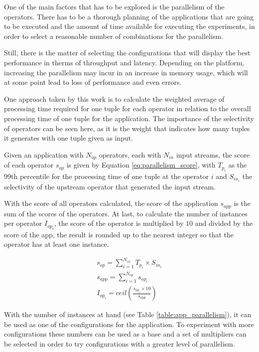\documentclass[ppgc,diss,english]{iiufrgs}
\begin{document}
One of the main factors that has to be explored is the parallelism of the operators. There has to be a thorough planning of the applications that are going to be executed and the amount of time available for executing the experiments, in order to select a reasonable number of combinations for the parallelism.

Still, there is the matter of selecting the configurations that will display the best performance in therms of throughput and latency. Depending on the platform, increasing the parallelism may incur in an increase in memory usage, which will at some point lead to loss of performance and even errors.

One approach taken by this work is to calculate the weighted average of processing time required for one tuple for each operator in relation to the overall processing time of one tuple for the application. The importance of the selectivity of operators can be seen here, as it is the weight that indicates how many tuples it generates with one tuple given as input.

Given an application with $N_{op}$ operators, each with $N_{in}$ input streams, the score of each operator $s_{op}$ is given by Equation \ref{eq:parallelism_score}, with $T_{p_{i}}$ as the 99th percentile for the processing time of one tuple at the operator $i$ and $S_{in_{i}}$ the selectivity of the upstream operator that generated the input stream.

With the score of all operators calculated, the score of the application $s_{app}$ is the sum of the scores of the operators. At last, to calculate the number of instances per operator $I_{op_{i}}$, the score of the operator is multiplied by $10$ and divided by the score of the app, the result is rounded up to the nearest integer so that the operator has at least one instance.

\begin{equation}\label{eq:parallelism_score}
  \begin{aligned}
  s_{op} = \sum_{i=1}^{N_{in}}T_{p_{i}} \times S_{in_{i}} \\
  s_{app} = \sum_{i=1}^{N_{op}}s_{op_{i}} \\
  I_{op_{i}} = ceil(\frac{s_{op_{i}} \times 10}{s_{app}})
  \end{aligned}
\end{equation}

With the number of instances at hand (see Table \ref{table:app_parallelism}), it can be used as one of the configurations for the application. To experiment with more configurations these numbers can be used as a base and a set of multipliers can be selected in order to try configurations with a greater level of parallelism.
\end{document}
